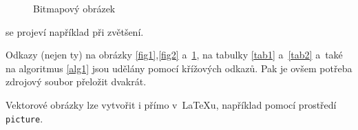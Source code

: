 \documentclass[11pt]{article}
\begin{document}
\begin{figure}[h]
    \centering
    \caption{Bitmapový obrázek}
    \label{fig3}
\end{figure}
\bigskip

\noindent se projeví například při zvětšení.\par
Odkazy (nejen ty) na obrázky \ref{fig1},\ref{fig2} a~\ref{fig3}, na  
tabulky \ref{tab1} a~\ref{tab2} a~také na algoritmus \ref{alg1} jsou udělány pomocí křížových odkazů. Pak je ovšem potřeba zdrojový soubor přeložit dvakrát.\par
Vektorové obrázky lze vytvořit i přímo v~\LaTeX{}u, například pomocí prostředí\texttt{ picture}.


\end{document}
